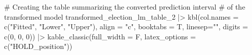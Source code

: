 \documentclass[
  letterpaper,
  DIV=11,
  numbers=noendperiod]{scrartcl}
\newenvironment{Shaded}{\begin{snugshade}}{\end{snugshade}}
\newcommand{\AttributeTok}[1]{\textcolor[rgb]{0.40,0.45,0.13}{#1}}
\newcommand{\CommentTok}[1]{\textcolor[rgb]{0.37,0.37,0.37}{#1}}
\newcommand{\DecValTok}[1]{\textcolor[rgb]{0.68,0.00,0.00}{#1}}
\newcommand{\FunctionTok}[1]{\textcolor[rgb]{0.28,0.35,0.67}{#1}}
\newcommand{\NormalTok}[1]{\textcolor[rgb]{0.00,0.23,0.31}{#1}}
\newcommand{\SpecialCharTok}[1]{\textcolor[rgb]{0.37,0.37,0.37}{#1}}
\newcommand{\StringTok}[1]{\textcolor[rgb]{0.13,0.47,0.30}{#1}}
\begin{document}
\begin{Shaded}
\begin{Highlighting}[]
\CommentTok{\# Creating the table summarizing the converted prediction interval}
\CommentTok{\# of the transformed model}
\NormalTok{transformed\_election\_lm\_table\_2 }\SpecialCharTok{|\textgreater{}} \FunctionTok{kbl}\NormalTok{(}\AttributeTok{col.names =} \FunctionTok{c}\NormalTok{(}\StringTok{"Fitted"}\NormalTok{, }\StringTok{"Lower"}\NormalTok{,}
                                       \StringTok{"Upper"}\NormalTok{), }
                         \AttributeTok{align =} \StringTok{"c"}\NormalTok{,}
                         \AttributeTok{booktabs =}\NormalTok{ T,}
                         \AttributeTok{linesep=}\StringTok{""}\NormalTok{,}
                         \AttributeTok{digits =} \FunctionTok{c}\NormalTok{(}\DecValTok{0}\NormalTok{, }\DecValTok{0}\NormalTok{, }\DecValTok{0}\NormalTok{)) }\SpecialCharTok{|\textgreater{}}
  \FunctionTok{kable\_classic}\NormalTok{(}\AttributeTok{full\_width =}\NormalTok{ F, }\AttributeTok{latex\_options =} \FunctionTok{c}\NormalTok{(}\StringTok{"HOLD\_position"}\NormalTok{))}
\end{Highlighting}
\end{Shaded}
\end{document}
